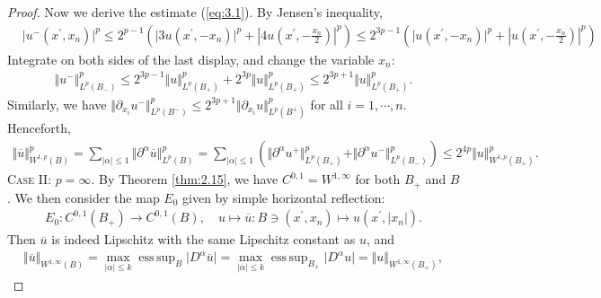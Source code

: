 \documentclass{article}
\numberwithin{equation}{section}
\newcommand{\ol}{\overline}
\DeclareMathOperator{\esssup}{ess\,sup}
\theoremstyle{plain}
\theoremstyle{definition}
\begin{document}
\begin{proof}
Now we derive the estimate (\ref{eq:3.1}). By Jensen's inequality,
\begin{align*}
	&\vert u^-(x^\prime, x_n)\vert^p\leq 2^{p-1}\left(\vert 3u(x^\prime,-x_n)\vert^p+\left\vert 4u(x^\prime,-\frac{x_n}{2})\right\vert^p\right)\leq 2^{3p-1}\left(\vert u(x^\prime,-x_n)\vert^p+\left\vert u(x^\prime,-\frac{x_n}{2})\right\vert^p\right)
\end{align*}
Integrate on both sides of the last display, and change the variable $x_n$:
\begin{align*}
\Vert u^-\Vert_{L^p(B_-)}^p\leq 2^{3p-1}\Vert u\Vert_{L^p(B_+)}^p+2^{3p}\Vert u\Vert_{L^p(B_+)}^p\leq 2^{3p+1}\Vert u\Vert_{L^p(B_+)}^p.
\end{align*}
Similarly, we have $\Vert\partial_{x_i}u^-\Vert_{L^p(B^-)}^p\leq 2^{3p+1}\Vert\partial_{x_i}u\Vert_{L^p(B^+)}^p$ for all $i=1,\cdots,n$. Henceforth,
\begin{align*}
	\Vert\ol{u}\Vert_{W^{1,p}(B)}^p = \sum_{\vert\alpha\vert\leq 1}\Vert\partial^\alpha\ol{u}\Vert_{L^p(B)}^p = \sum_{\vert\alpha\vert\leq 1}\left(\Vert\partial^\alpha u^+\Vert_{L^p(B_+)}^p+\Vert\partial^\alpha u^-\Vert_{L^p(B_-)}^p\right)\leq 2^{4p}\Vert u\Vert_{W^{1,p}(B_+)}^p.
\end{align*}
\textsc{Case II: $p=\infty$.} By Theorem \ref{thm:2.15}, we have $C^{0,1}=W^{1,\infty}$ for both $B_+$ and $B$. We then consider the map $E_0$ given by simple horizontal reflection:
\begin{align*}
	E_0:C^{0,1}(B_+)\to C^{0,1}(B),\quad u\mapsto\ol{u}:B\ni(x^\prime,x_n)\mapsto u(x^\prime,\vert x_n\vert).
\end{align*}
Then $\ol{u}$ is indeed Lipschitz with the same Lipschitz constant as $u$, and
\begin{align*}
	\Vert\ol{u}\Vert_{W^{1,\infty}(B)}=\max_{\vert\alpha\vert\leq k}\esssup_{B}\vert D^\alpha\ol{u}\vert=\max_{\vert\alpha\vert\leq k}\esssup_{B_+}\vert D^\alpha u\vert=\Vert u\Vert_{W^{1,\infty}(B_+)},
\end{align*}


\end{proof}
\end{document}
